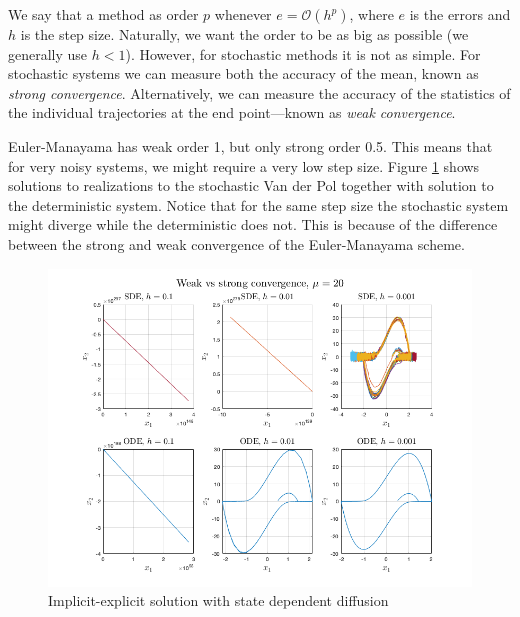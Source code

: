 We say that a method as order $p$ whenever $e = \mathcal{O}(h^p)$, where $e$ is the errors and $h$ is the step size. Naturally, we want the order to be as big as possible (we generally use $h<1$). However, for stochastic methods it is not as simple. For stochastic systems we can measure both the accuracy of the mean, known as \textit{strong convergence}. Alternatively, we can measure the accuracy of the statistics of the individual trajectories at the end point---known as \textit{weak convergence}. 

Euler-Manayama has weak order 1, but only strong order 0.5. This means that for very noisy systems, we might require a very low step size. Figure \ref{fig4:sde_order} shows solutions to realizations to the stochastic Van der Pol together with solution to the deterministic system. Notice that for the same step size the stochastic system might diverge while the deterministic does not. This is because of the difference between the strong and weak convergence of the Euler-Manayama scheme. 

\begin{figure}[H]
    \centering
    \includegraphics[width=\textwidth]{graphics/opg4/sde_order.png}
    \caption{Implicit-explicit solution with state dependent diffusion}
    \label{fig4:sde_order}
\end{figure}





